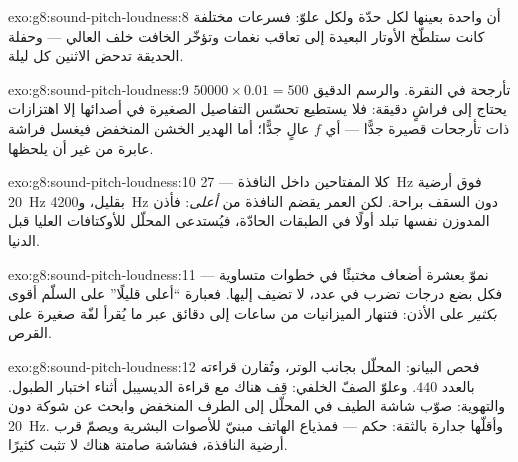 \begin{solution}{exo:g8:sound-pitch-loudness:8}
أن  واحدة بعينها لكل حدّة ولكل علوّ: فسرعات مختلفة كانت
ستلطّخ الأوتار البعيدة إلى تعاقب نغمات وتؤخّر الخافت خلف
العالي --- وحفلة الحديقة تدحض الاثنين كل ليلة.
\end{solution}

\begin{solution}{exo:g8:sound-pitch-loudness:9}
$50000 \times 0.01 = 500$ تأرجحة في النقرة. والرسم الدقيق
يحتاج إلى فراشٍ دقيقة: فلا يستطيع تحسّس التفاصيل الصغيرة في
أصدائها إلا اهتزازات ذات تأرجحات قصيرة جدًّا --- أي  $f$
عالٍ جدًّا؛ أما الهدير الخشن المنخفض  فيغسل فراشة
عابرة من غير أن يلحظها.
\end{solution}

\begin{solution}{exo:g8:sound-pitch-loudness:10}
كلا المفتاحين داخل النافذة --- \qty{27}{Hz} فوق أرضية
\qty{20}{Hz} بقليل، و\qty{4200}{Hz} دون السقف براحة. لكن
العمر يقضم النافذة من \emph{أعلى}: فأذن المدوزن نفسها تبلد
أولًا في الطبقات الحادّة، فيُستدعى المحلّل للأوكتافات العليا
قبل الدنيا.
\end{solution}

\begin{solution}{exo:g8:sound-pitch-loudness:11}
نموّ بعشرة أضعاف مختبئًا في خطوات متساوية --- فكل بضع درجات
تضرب   في عدد، لا تضيف إليها. فعبارة ``أعلى قليلًا'' على
السلّم أقوى \emph{بكثير} على الأذن: فتنهار الميزانيات من
ساعات إلى دقائق عبر ما يُقرأ لفّة صغيرة على القرص.
\end{solution}

\begin{solution}{exo:g8:sound-pitch-loudness:12}
فحص البيانو: المحلّل بجانب الوتر، وتُقارن قراءته بالعدد $440$.
وعلوّ الصفّ الخلفي: قِف هناك مع قراءة الديسيبل أثناء اختبار
الطبول. والتهوية: صوّب شاشة الطيف في المحلّل إلى الطرف
المنخفض وابحث عن شوكة دون \qty{20}{Hz}. وأقلّها جدارة بالثقة:
حكم  --- فمذياع الهاتف مبنيّ للأصوات
البشرية ويصمّ قرب أرضية النافذة، فشاشة صامتة هناك لا تثبت
كثيرًا.
\end{solution}

